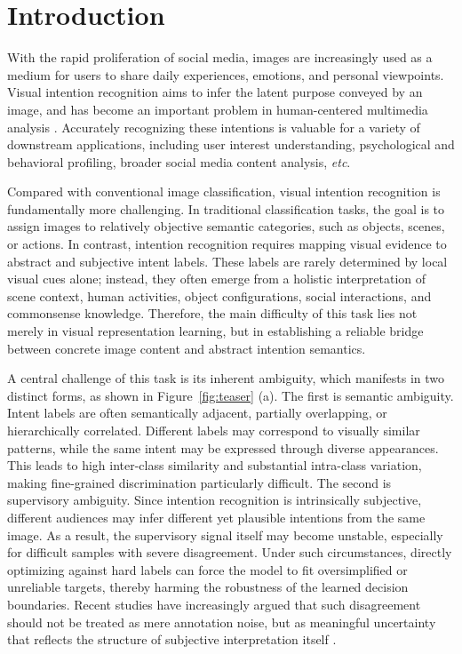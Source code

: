 \section{Introduction}
\label{sec:intro}

With the rapid proliferation of social media, images are increasingly used as a medium for users to share daily experiences, emotions, and personal viewpoints. 
Visual intention recognition aims to infer the latent purpose conveyed by an image, and has become an important problem in human-centered multimedia analysis \cite{jia_intentonomy_2021, wen_dip_2023}. 
Accurately recognizing these intentions is valuable for a variety of downstream applications, including user interest understanding, psychological and behavioral profiling, broader social media content analysis, \textit{etc}.

Compared with conventional image classification, visual intention recognition is fundamentally more challenging.
In traditional classification tasks, the goal is to assign images to relatively objective semantic categories, such as objects, scenes, or actions. 
In contrast, intention recognition requires mapping visual evidence to abstract and subjective intent labels.
These labels are rarely determined by local visual cues alone; instead, they often emerge from a holistic interpretation of scene context, human activities, object configurations, social interactions, and commonsense knowledge.
Therefore, the main difficulty of this task lies not merely in visual representation learning, but in establishing a reliable bridge between concrete image content and abstract intention semantics.

A central challenge of this task is its inherent ambiguity, which manifests in two distinct forms, as shown in Figure~\ref{fig:teaser} (a).
The first is semantic ambiguity. 
Intent labels are often semantically adjacent, partially overlapping, or hierarchically correlated. 
Different labels may correspond to visually similar patterns, while the same intent may be expressed through diverse appearances. 
This leads to high inter-class similarity and substantial intra-class variation, making fine-grained discrimination particularly difficult.
The second is supervisory ambiguity. 
Since intention recognition is intrinsically subjective, different audiences may infer different yet plausible intentions from the same image. 
As a result, the supervisory signal itself may become unstable, especially for difficult samples with severe disagreement. 
Under such circumstances, directly optimizing against hard labels can force the model to fit oversimplified or unreliable targets, thereby harming the robustness of the learned decision boundaries.
Recent studies have increasingly argued that such disagreement should not be treated as mere annotation noise, but as meaningful uncertainty that reflects the structure of subjective interpretation itself \cite{peterson_human_2019, mostafazadeh_davani_dealing_2022}.

